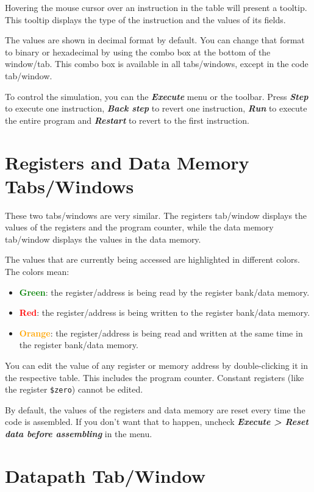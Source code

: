 \documentclass[11pt,a4paper,twoside,titlepage]{article}
\newcommand{\menupath}[1]{\textbf{\emph{#1}}}
\begin{document}
Hovering the mouse cursor over an instruction in the table will present a
tooltip. This tooltip displays the type of the instruction and the values
of its fields.

The values are shown in decimal format by default.
You can change that format to binary or hexadecimal by using the combo box
at the bottom of the window/tab.
This combo box is available in all tabs/windows, except in the code tab/window.

To control the simulation, you can the \menupath{Execute} menu or the toolbar.
Press \menupath{Step} to execute one instruction, \menupath{Back step}
to revert one instruction, \menupath{Run} to execute the entire program and
\menupath{Restart} to revert to the first instruction.


\section{Registers and Data Memory Tabs/Windows}

These two tabs/windows are very similar.
The registers tab/window displays the values of the registers and the program
counter, while the data memory tab/window displays the values in the data
memory.

The values that are currently being accessed are highlighted in different 
colors. The colors mean:
\begin{itemize}
	\item \textbf{\textcolor{green}{Green}}: the register/address is being 
		read by the register bank/data memory.
	\item \textbf{\textcolor{red}{Red}}: the register/address is being written 
		to the register bank/data memory.
	\item \textbf{\textcolor{orange}{Orange}}: the register/address is being 
		read and written at the same time in the register bank/data memory.
\end{itemize}

You can edit the value of any register or memory address by double-clicking
it in the respective table. This includes the program counter.
Constant registers (like the register \verb+$zero+) cannot be edited.

By default, the values of the registers and data memory are reset every time
the code is assembled.
If you don't want that to happen, uncheck 
\menupath{Execute > Reset data before assembling} in the menu.


\section{Datapath Tab/Window}

\end{document}
